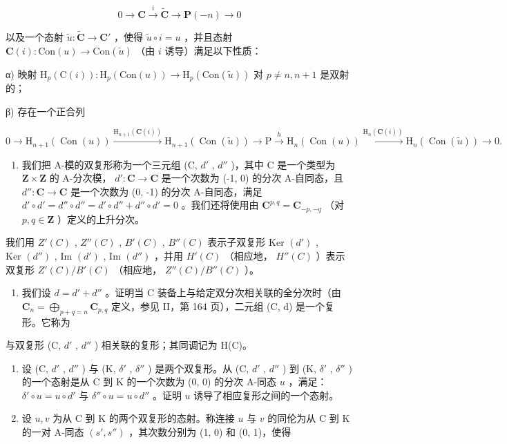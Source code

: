 \[
0 \to \mathbf {C} \xrightarrow {i} \tilde {\mathbf {C}} \to \mathbf {P} (- n) \to 0
\]

以及一个态射 \(\tilde{u}:\tilde{\mathbf{C}}\to \mathbf{C}'\) ，使得 \(\tilde{u}\circ i = u\) ，并且态射 \(\mathbf{C}(i):\mathrm{Con}(u)\to \mathrm{Con}(\tilde{u})\) （由 \(i\) 诱导）满足以下性质：

α) 映射 \(\mathrm{H}_{p}(\mathrm{C}(i)) : \mathrm{H}_{p}(\mathrm{Con}(u)) \to \mathrm{H}_{p}(\mathrm{Con}(\tilde{u}))\) 对 \(p \neq n, n + 1\) 是双射的；

β) 存在一个正合列

\[
0 \rightarrow \mathrm{H} _ {n + 1} (\operatorname{Con} (u)) \xrightarrow {\mathrm{H} _ {n + 1} (\mathbf {C} (i))} \mathrm{H} _ {n + 1} (\operatorname{Con} (\tilde {u})) \rightarrow \mathrm{P} \xrightarrow {h} \mathrm{H} _ {n} (\operatorname{Con} (u)) \xrightarrow {\mathrm{H} _ {n} (\mathbf {C} (i))} \mathrm{H} _ {n} (\operatorname{Con} (\tilde {u})) \rightarrow 0.
\]

\begin{enumerate}
\def\labelenumi{\arabic{enumi})}
\setcounter{enumi}{10}
\tightlist
\item
  我们把 A-模的双复形称为一个三元组 (C, \(d'\) , \(d''\) )，其中 C 是一个类型为 \(\mathbf{Z} \times \mathbf{Z}\) 的 A-分次模， \(d': \mathbf{C} \to \mathbf{C}\) 是一个次数为 (-1, 0) 的分次 A-自同态，且 \(d'': \mathbf{C} \to \mathbf{C}\) 是一个次数为 (0, -1) 的分次 A-自同态，满足 \(d' \circ d' = d'' \circ d'' = d' \circ d'' + d'' \circ d' = 0\) 。我们还将使用由 \(\mathbf{C}^{p,q} = \mathbf{C}_{-p,-q}\) （对 \(p, q \in \mathbf{Z}\) ）定义的上升分次。
\end{enumerate}

我们用 \(Z'(C)\) , \(Z''(C)\) , \(B'(C)\) , \(B''(C)\) 表示子双复形 \(\text{Ker } (d')\) , \(\text{Ker } (d'')\) , \(\text{Im } (d')\) , \(\text{Im } (d'')\) ，并用 \(H'(C)\) （相应地， \(H''(C)\) ）表示双复形 \(Z'(C)/B'(C)\) （相应地， \(Z''(C)/B''(C)\) ）。

\begin{enumerate}
\def\labelenumi{\alph{enumi})}
\tightlist
\item
  我们设 \(d = d' + d''\) 。证明当 C 装备上与给定双分次相关联的全分次时（由 \(\mathbf{C}_n = \bigoplus_{p+q=n} \mathbf{C}_{p,q}\) 定义，参见 II，第 164 页），二元组 (C, d) 是一个复形。它称为
\end{enumerate}

与双复形 (C, \(d'\) , \(d''\) ) 相关联的复形；其同调记为 H(C)。

\begin{enumerate}
\def\labelenumi{\alph{enumi})}
\setcounter{enumi}{1}
\item
  设 (C, \(d'\) , \(d''\) ) 与 (K, \(\delta'\) , \(\delta''\) ) 是两个双复形。从 (C, \(d'\) , \(d''\) ) 到 (K, \(\delta'\) , \(\delta''\) ) 的一个态射是从 C 到 K 的一个次数为 (0, 0) 的分次 A-同态 \(u\) ，满足： \(\delta'\circ u = u \circ d'\) 与 \(\delta''\circ u = u \circ d''\) 。证明 \(u\) 诱导了相应复形之间的一个态射。
\item
  设 \(u, v\) 为从 C 到 K 的两个双复形的态射。称连接 \(u\) 与 \(v\) 的同伦为从 C 到 K 的一对 A-同态 \((s', s'')\) ，其次数分别为 (1, 0) 和 (0, 1)，使得
\end{enumerate}

